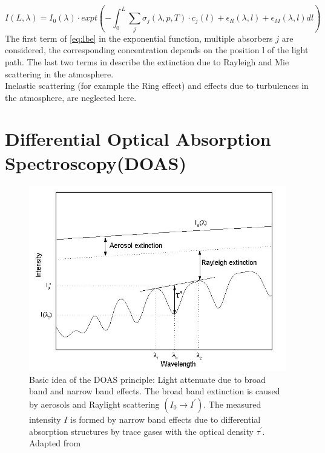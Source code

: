 \documentclass  [
  paper    = a4,
  BCOR     = 10mm,
  twoside,
  fontsize = 12pt,
  fleqn,
  toc      = bibnumbered,
  toc      = listofnumbered,
  numbers  = noendperiod,
  headings = normal,
  listof   = leveldown,
  version  = 3.03
]                                       {scrreprt}
\begin{document}
	\begin{equation}
	I\left(L,\lambda\right) = I_{0}\left(\lambda\right)\cdot expt\left(-\int^{L}_{0}\sum_{j}\sigma_{j}\left(\lambda,p,T\right)\cdot
	c_{j}\left(l\right)+\epsilon_R\left(\lambda,l\right)+\epsilon_{M}\left(\lambda,l\right)dl\right)
	\label{eq:lbe}
	\end{equation}
	The first term of \cref{eq:lbe} in the exponential function, multiple absorbers $j$ are considered, the corresponding concentration depends on the position l of the light path.
	The last two terms in describe the extinction due to Rayleigh and Mie scattering in the atmosphere.\\
	Inelastic scattering (for example the Ring effect) and effects due to turbulences in the atmosphere, are neglected here.

	\section{Differential Optical Absorption Spectroscopy(DOAS)\label{DOAS}}
		\begin{figure}
			\centering
			\includegraphics[width=0.7\linewidth]{Bilder/Simon/Bilder_Tung/DOAS_Intensity}
			\caption{Basic idea of the DOAS principle: Light attenuate due to broad band and narrow band effects. The broad band extinction is caused by aerosols and Raylight scattering $\left(I_0\rightarrow I^{'}\right)$. The measured intensity $I$ is formed by narrow band effects due to differential absorption structures by trace gases with the optical density $\tau^{'}$. Adapted from \cite{kern2009spectroscopic}}
			\label{fig:doasintensity}
		\end{figure}
		
\end{document}

